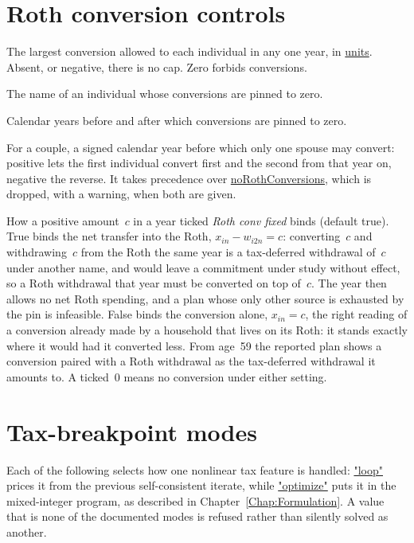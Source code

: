 \documentclass[fleqn,12pt]{report}
\newcommand{\code}[1]{\url{#1}}
\begin{document}
\section{Roth conversion controls}
\label{sec:rothConversionControls}

\begin{description}[style=nextline, leftmargin=1.5cm, font=\ttfamily]
\item[maxRothConversion]
The largest conversion allowed to each individual in any one year, in
\code{units}.  Absent, or negative, there is no cap.  Zero forbids conversions.
\item[noRothConversions]
The name of an individual whose conversions are pinned to zero.
\item[startRothConversions, stopRothConversions]
Calendar years before and after which conversions are pinned to zero.
\item[swapRothConverters]
For a couple, a signed calendar year before which only one spouse may convert:
positive lets the first individual convert first and the second from that year
on, negative the reverse.  It takes precedence over \code{noRothConversions},
which is dropped, with a warning, when both are given.
\item[netRothPins]
How a positive amount~$c$ in a year ticked \textit{Roth conv fixed} binds
(default true).  True binds the net transfer into the Roth,
$x_{in} - w_{i2n} = c$: converting~$c$ and withdrawing~$c$ from the Roth the same
year is a tax-deferred withdrawal of~$c$ under another name, and would leave a
commitment under study without effect, so a Roth withdrawal that year must be
converted on top of~$c$.  The year then allows no net Roth spending, and a plan
whose only other source is exhausted by the pin is infeasible.  False binds the
conversion alone, $x_{in} = c$, the right reading of a conversion already made
by a household that lives on its Roth: it stands exactly where it would had it
converted less.  From age~59\textonehalf{} the reported plan shows a conversion
paired with a Roth withdrawal as the tax-deferred withdrawal it amounts to.  A
ticked~0 means no conversion under either setting.
\end{description}

\section{Tax-breakpoint modes}

Each of the following selects how one nonlinear tax feature is handled:
\code{"loop"} prices it from the previous self-consistent iterate, while
\code{"optimize"} puts it in the mixed-integer program, as described in
Chapter~\ref{Chap:Formulation}.
A value that is none of the documented modes is refused rather than silently
solved as another.
\end{document}
